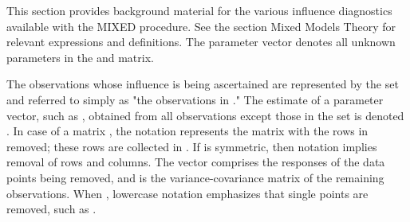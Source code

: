 This section provides background material for the various influence diagnostics available with the MIXED procedure. See the section Mixed Models Theory for relevant expressions and definitions. The parameter vector denotes all unknown parameters in the and matrix. 

The observations whose influence is being ascertained are represented by the set and referred to simply as "the observations in ." The estimate of a parameter vector, such as , obtained from all observations except those in the set is denoted . In case of a matrix , the notation represents the matrix with the rows in removed; these rows are collected in . If is symmetric, then notation implies removal of rows and columns. The vector comprises the responses of the data points being removed, and is the variance-covariance matrix of the remaining observations. When , lowercase notation emphasizes that single points are removed, such as . 
